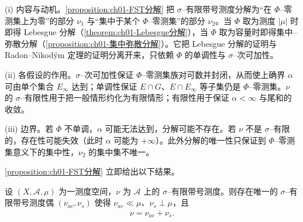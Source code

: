 \documentclass[../../main.tex]{subfiles}%
\begin{document}
\begin{remark}\label{remark:ch01-FST分解动机}
(i) 内容与动机。\cref{proposition:ch01-FST分解} 把 $\sigma$--有限带号测度分解为“在 $\Phi$--零测集上为零”的部分 $\nu_1$ 与“集中于某个 $\Phi$--零测集”的部分 $\nu_2$。当 $\Phi$ 取为测度 $|\mu|$ 时即得 Lebesgue 分解（\cref{theorem:ch01-Lebesgue分解}），当 $\Phi$ 取为容量时即得集中--弥散分解（\cref{proposition:ch01-集中弥散分解}）。它把 Lebesgue 分解的证明与 Radon--Nikodým 定理的证明分离开来，只依赖 $\Phi$ 的单调性与 $\sigma$--次可加性。

(ii) 各假设的作用。$\sigma$--次可加性保证 $\Phi$--零测集族对可数并封闭，从而使上确界 $\alpha$ 可由单个集合 $E_\infty$ 达到；单调性保证 $E\cap G$、$E\cap E_\infty$ 等子集仍是 $\Phi$--零测集。$\nu$ 的 $\sigma$--有限性用于把一般情形约化为有限情形；有限性用于保证 $\alpha<\infty$ 与尾和的收敛。

(iii) 边界。若 $\Phi$ 不单调，$\alpha$ 可能无法达到，分解可能不存在。若 $\nu$ 不是 $\sigma$--有限的，存在性可能失效（此时 $\alpha$ 可能为 $+\infty$）。此外分解的唯一性只保证到 $\Phi$--零测集意义下的集中性，$\nu_2$ 的集中集不唯一。
\end{remark}

\cref{proposition:ch01-FST分解} 立即给出以下结果。

\begin{theorem}[Lebesgue]\label{theorem:ch01-Lebesgue分解}
设 $(X,\mathcal{A},\mu)$ 为一测度空间，$\nu$ 为 $\mathcal{A}$ 上的 $\sigma$--有限带号测度。则存在唯一的 $\sigma$--有限带号测度偶 $(\nu_{ac},\nu_s)$ 使得 $\nu_{ac}\ll\mu$、$\nu_s\perp\mu$，且
\begin{align}
\nu=\nu_{ac}+\nu_s. \label{align:ch01-Lebesgue分解式}
\end{align}
\end{theorem}
\end{document}
